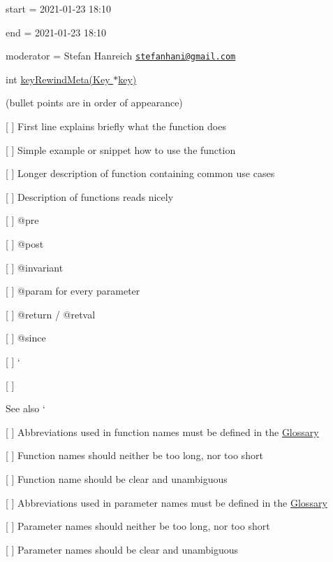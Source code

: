 
\begin{DoxyItemize}
\item start = 2021-\/01-\/23 18\+:10
\item end = 2021-\/01-\/23 18\+:10
\item moderator = Stefan Hanreich \href{mailto:stefanhani@gmail.com}{\tt stefanhani@gmail.\+com}
\end{DoxyItemize}

{\ttfamily int \hyperlink{group__keymeta_ga5dbb669802eea27e106ee3a5e39717a9}{key\+Rewind\+Meta(\+Key $\ast$key)}}

(bullet points are in order of appearance)


\begin{DoxyItemize}
\item \mbox{[} \mbox{]} First line explains briefly what the function does
\item \mbox{[} \mbox{]} Simple example or snippet how to use the function
\item \mbox{[} \mbox{]} Longer description of function containing common use cases
\item \mbox{[} \mbox{]} Description of functions reads nicely
\item \mbox{[} \mbox{]} {\ttfamily @pre}
\item \mbox{[} \mbox{]} {\ttfamily @post}
\item \mbox{[} \mbox{]} {\ttfamily @invariant}
\item \mbox{[} \mbox{]} {\ttfamily @param} for every parameter
\item \mbox{[} \mbox{]} {\ttfamily @return} / {\ttfamily @retval}
\item \mbox{[} \mbox{]} {\ttfamily @since}
\item \mbox{[} \mbox{]} `{\ttfamily }
\item {\ttfamily \mbox{[} \mbox{]}}\begin{DoxySeeAlso}{See also}
`
\end{DoxySeeAlso}

\end{DoxyItemize}


\begin{DoxyItemize}
\item \mbox{[} \mbox{]} Abbreviations used in function names must be defined in the \hyperlink{doc_help_elektra-glossary_md}{Glossary}
\item \mbox{[} \mbox{]} Function names should neither be too long, nor too short
\item \mbox{[} \mbox{]} Function name should be clear and unambiguous
\item \mbox{[} \mbox{]} Abbreviations used in parameter names must be defined in the \hyperlink{doc_help_elektra-glossary_md}{Glossary}
\item \mbox{[} \mbox{]} Parameter names should neither be too long, nor too short
\item \mbox{[} \mbox{]} Parameter names should be clear and unambiguous
\end{DoxyItemize}

